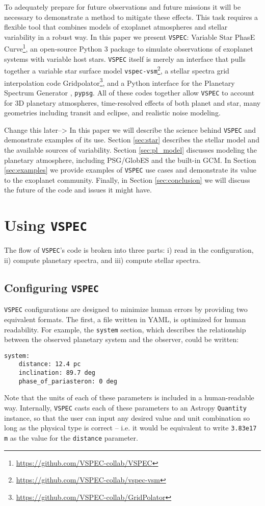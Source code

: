 \documentclass[twocolumn]{aastex631}
\newcommand{\TJ}[1]{\textcolor{tedcommentcolor}{#1}}
\newcommand{\vspec}[1]{\texttt{VSPEC}#1}
\begin{document}
To adequately prepare for future observations and future missions it will be necessary to demonstrate a method to mitigate these effects.
This task requires a flexible tool that combines models of exoplanet atmospheres and stellar variability in a robust way. In this paper we present \vspec{}: Variable Star PhasE Curve\footnote{\url{https://github.com/VSPEC-collab/VSPEC}},
an open-source Python 3 package to simulate observations of exoplanet systems with variable host stars.
\vspec{} itself is merely an interface that pulls together a variable star surface model \texttt{vspec-vsm}\footnote{\url{https://github.com/VSPEC-collab/vspec-vsm}},
a stellar spectra grid interpolation code Gridpolator\footnote{\url{https://github.com/VSPEC-collab/GridPolator}}, and a Python interface for
the Planetary Spectrum Generator \citep[PSG,][]{villanueva2018}, \texttt{pypsg}. All of these codes together allow \vspec{} to account for
3D planetary atmospheres, time-resolved effects of both planet and star, many geometries including transit and eclipse, and realistic noise modeling.

\TJ{Change this later-->}
In this paper we will describe the science behind \vspec{} and demonstrate examples of its use.
Section \ref{sec:star} describes the stellar model and the available sources of variability.
Section \ref{sec:pl_model} discusses modeling the planetary atmosphere, including PSG/GlobES and the
built-in GCM. In Section \ref{sec:examples} we provide examples of \vspec{} use cases and demonstrate
its value to the exoplanet community. Finally, in Section \ref{sec:conclusion} we will discuss the future of the code and issues it might have.

\section{Using \vspec{}}
\label{sec:vspec}

The flow of \vspec{}'s code is broken into three parts: i) read in the configuration, ii) compute planetary spectra, and iii) compute stellar spectra.
\subsection{Configuring \vspec{}}
\label{subsec:config}

\vspec{} configurations are designed to minimize human errors by providing two equivalent formats. The first, a file written in YAML, is optimized for
human readability. For example, the \texttt{system} section, which describes the relationship between the observed planetary system and the observer, could
be written:
\begin{lstlisting}[label={ls:yaml}]
system:
    distance: 12.4 pc
    inclination: 89.7 deg
    phase_of_pariasteron: 0 deg
\end{lstlisting}
Note that the units of each of these parameters is included in a human-readable way. Internally, \vspec{} casts each of these parameters to an Astropy
\texttt{Quantity} instance, so that the user can input any desired value and unit combination so long as the physical type is correct -- i.e. it would be
equivalent to write \texttt{3.83e17 m} as the value for the \texttt{distance} parameter.
\end{document}

